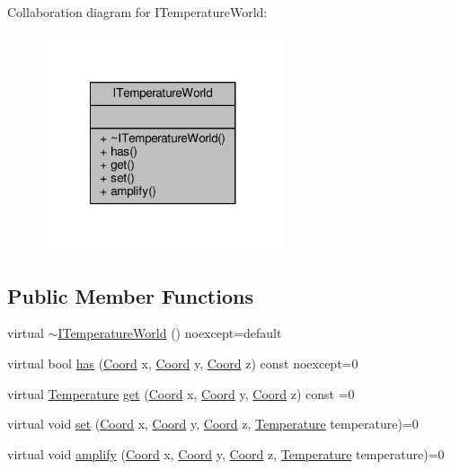 Collaboration diagram for I\-Temperature\-World\-:
\nopagebreak
\begin{figure}[H]
\begin{center}
\leavevmode
\includegraphics[width=200pt]{class_i_temperature_world__coll__graph}
\end{center}
\end{figure}
\subsection*{Public Member Functions}
\begin{DoxyCompactItemize}
\item 
virtual \hyperlink{class_i_temperature_world_aa02b99dc75ef0f32db7860c208526254}{$\sim$\-I\-Temperature\-World} () noexcept=default
\item 
virtual bool \hyperlink{class_i_temperature_world_a6c498247ed71d9ad037dd0c1b4779f81}{has} (\hyperlink{struct_coord}{Coord} x, \hyperlink{struct_coord}{Coord} y, \hyperlink{struct_coord}{Coord} z) const noexcept=0
\item 
virtual \hyperlink{struct_temperature}{Temperature} \hyperlink{class_i_temperature_world_a9993df60754c2c89597bd8137568c12f}{get} (\hyperlink{struct_coord}{Coord} x, \hyperlink{struct_coord}{Coord} y, \hyperlink{struct_coord}{Coord} z) const =0
\item 
virtual void \hyperlink{class_i_temperature_world_ab23db7ec9a890d6dbb172b26c2fd3d00}{set} (\hyperlink{struct_coord}{Coord} x, \hyperlink{struct_coord}{Coord} y, \hyperlink{struct_coord}{Coord} z, \hyperlink{struct_temperature}{Temperature} temperature)=0
\item 
virtual void \hyperlink{class_i_temperature_world_ac5a8a92e7141b2e2c2e3d66ba73b7c1e}{amplify} (\hyperlink{struct_coord}{Coord} x, \hyperlink{struct_coord}{Coord} y, \hyperlink{struct_coord}{Coord} z, \hyperlink{struct_temperature}{Temperature} temperature)=0
\end{DoxyCompactItemize}


